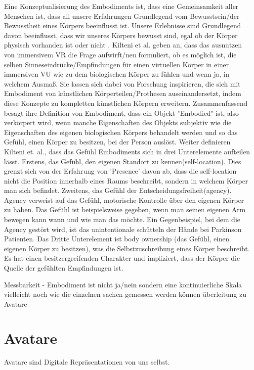 Eine Konzeptualisierung des Embodiments ist, dass eine Gemeinsamkeit aller Menschen ist, dass all unsere Erfahrungen Grundlegend vom Bewusstsein/der Bewusstheit eines Körpers beeinflusst ist. Unsere Erlebnisse sind Grundlegend davon beeinflusst, dass wir unseres Körpers bewusst sind, egal ob der Körper physisch vorhanden ist oder nicht \cite{Tham2018}
. Kilteni et al. \cite{Kilteni2012} geben an, dass das ausnutzen von immersivem VR die Frage aufwirft/neu formuliert, ob es möglich ist, die selben Sinneseindrücke/Empfindungen für einen virtuellen Körper in einer immersiven VU wie zu dem biologischen Körper zu fühlen und wenn ja, in welchem Ausmaß. Sie lassen sich  dabei von Forschung inspirieren, die sich mit Embodiment von künstlichen Körperteilen/Prothesen auseinandersetzt, indem diese Konzepte zu kompletten künstlichen Körpern erweitern. Zusammenfassend besagt ihre Definition von Embodiment, dass ein Objekt "Embodied" ist, also verkörpert wird, wenn manche Eigenschaften des Objekts subjektiv wie die Eigenschaften des eigenen biologischen Körpers behandelt werden und so das Gefühl,  einen Körper zu besitzen,  bei der Person auslöst.
Weiter definieren Kilteni et. al., dass das Gefühl Embodiments sich in drei Unterelemente aufteilen lässt. Erstens, das Gefühl, den eigenen Standort zu kennen(self-location).  Dies grenzt sich von der Erfahrung von 'Presence' davon ab, dass die self-location nicht die Position innerhalb eines Raums beschreibt, sondern in welchem Körper man sich befindet. Zweitens, das Gefühl der Entscheidungsfreiheit(agency). Agency verweist auf das Gefühl, motorische Kontrolle über den eigenen Körper zu haben. Das Gefühl ist beispielsweise gegeben, wenn man seinen eigenen Arm bewegen kann wann und wie man das möchte. Ein Gegenbeispiel, bei dem die Agency gestört wird, ist das unintentionale schütteln der Hände bei  Parkinson Patienten. Das Dritte Unterelement ist body ownership (das Gefühl, einen eigenen Körper zu besitzen), was die Selbstzuschreibung eines Körper beschreibt. Es hat einen besitzergreifenden Charakter und impliziert, dass der Körper die Quelle der gefühlten Empfindungen ist.

Messbarkeit - Embodiment ist nicht ja/nein sondern eine kontinuierliche Skala
vielleicht noch wie die einzelnen sachen gemessen werden können
\cite{Kilteni2012}
überleitung zu Avatare

\section{Avatare}
Avatare sind Digitale Repräsentationen von uns selbst. 


